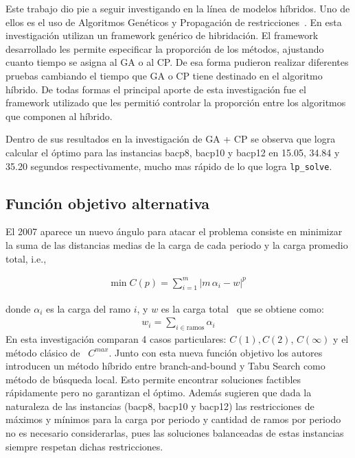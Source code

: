 \documentclass[letterpaper,10pt]{article}
\begin{document}
Este trabajo dio pie a seguir investigando en la línea de modelos híbridos. Uno de ellos es el uso de Algoritmos Genéticos y Propagación de restricciones~\cite{Rutkowski}. En esta investigación utilizan un framework genérico de hibridación. El framework desarrollado les permite especificar la proporción de los métodos, ajustando cuanto tiempo se asigna al GA o al CP. De esa forma pudieron realizar diferentes pruebas cambiando el tiempo que GA o CP tiene destinado en el algoritmo híbrido. De todas formas el principal aporte de esta investigación fue el framework utilizado que les permitió controlar la proporción entre los algoritmos que componen al híbrido.

Dentro de sus resultados en la investigación de GA + CP se observa que logra calcular el óptimo para las instancias bacp8, bacp10 y bacp12 en 15.05, 34.84 y 35.20 segundos respectivamente, mucho mas rápido de lo que logra \verb+lp_solve+.

\subsection{Función objetivo alternativa}

El 2007 aparece un nuevo ángulo para atacar el problema consiste en minimizar la suma de las distancias medias de la carga de cada periodo y la carga promedio total, i.e.,

\begin{align*}
  \text{min} \; C(p) = \sum_{i=1}^{m} |m\,\alpha_i - w |^p
\end{align*}

donde $\alpha_i$ es la carga del ramo $i$, y $w$ es la carga total~\cite{Monette07acp} que se obtiene como:
\begin{align*}
  w_i = \sum_{i \in \text{ramos}} \alpha_i
\end{align*}
 En esta investigación comparan 4 casos particulares: $C(1), C(2)$, $C(\infty)$ y el método clásico de~\cite{DBLP:journals/corr/cs-PL-0110007} $C^{max}$. Junto con esta nueva función objetivo los autores introducen un método híbrido entre branch-and-bound y Tabu Search como método de búsqueda local. Esto permite encontrar soluciones factibles rápidamente pero no garantizan el óptimo.
Además sugieren que dada la naturaleza de las instancias (bacp8, bacp10 y bacp12) las restricciones de máximos y mínimos para la carga por periodo y cantidad de ramos por periodo no es necesario considerarlas, pues las soluciones balanceadas de estas instancias siempre respetan dichas restricciones.
\end{document}
